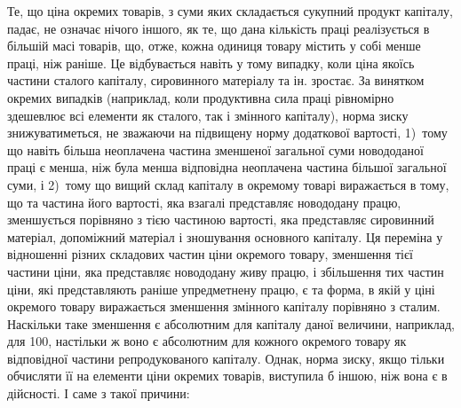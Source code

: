 Те, що ціна окремих товарів, з суми яких складається сукупний продукт капіталу, падає, не означає
нічого іншого, як те, що дана кількість праці реалізується в більшій масі товарів, що, отже, кожна
одиниця товару містить у собі менше праці, ніж раніше. Це відбувається навіть у тому випадку, коли
ціна якоїсь частини сталого капіталу, сировинного матеріалу та ін. зростає. За винятком окремих
випадків (наприклад, коли продуктивна сила праці рівномірно здешевлює всі елементи як сталого, так і
змінного капіталу), норма зиску знижуватиметься, не зважаючи на підвищену норму додаткової вартості,
1)~тому що навіть більша неоплачена частина зменшеної загальної суми новододаної праці є менша, ніж
була менша відповідна неоплачена частина більшої загальної суми, і 2)~тому що вищий склад капіталу в
окремому товарі виражається в тому, що та частина його вартості, яка взагалі представляє новододану
працю, зменшується порівняно з тією частиною вартості, яка представляє сировинний матеріал,
допоміжний матеріал і зношування основного капіталу. Ця переміна у відношенні різних складових
частин ціни окремого товару, зменшення тієї частини ціни, яка представляє новододану живу працю, і
збільшення тих частин ціни, які представляють раніше упредметнену працю, є та форма, в якій у ціні
окремого товару виражається зменшення змінного капіталу порівняно з сталим. Наскільки таке зменшення
є абсолютним для капіталу даної величини, наприклад, для 100, настільки ж воно є абсолютним для
кожного окремого товару як відповідної частини репродукованого капіталу. Однак, норма зиску, якщо
тільки обчисляти її на елементи ціни окремих товарів, виступила б іншою, ніж вона є в дійсності. І
саме з такої причини:
